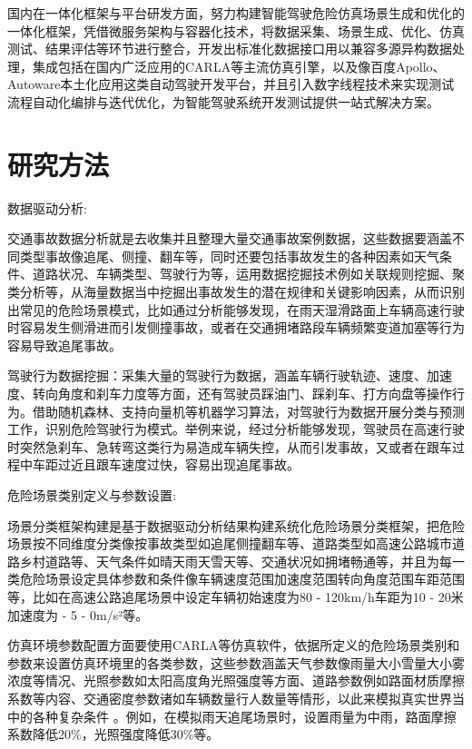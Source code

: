 国内在一体化框架与平台研发方面，努力构建智能驾驶危险仿真场景生成和优化的一体化框架，凭借微服务架构与容器化技术，将数据采集、场景生成、优化、仿真测试、结果评估等环节进行整合，开发出标准化数据接口用以兼容多源异构数据处理，集成包括在国内广泛应用的CARLA等主流仿真引擎，以及像百度Apollo、Autoware本土化应用这类自动驾驶开发平台，并且引入数字线程技术来实现测试流程自动化编排与迭代优化\cite{dingus2006100}，为智能驾驶系统开发测试提供一站式解决方案。

\section{研究方法}

数据驱动分析:

交通事故数据分析就是去收集并且整理大量交通事故案例数据，这些数据要涵盖不同类型事故像追尾、侧撞、翻车等，同时还要包括事故发生的各种因素如天气条件、道路状况、车辆类型、驾驶行为等，运用数据挖掘技术例如关联规则挖掘、聚类分析等，从海量数据当中挖掘出事故发生的潜在规律和关键影响因素，从而识别出常见的危险场景模式，比如通过分析能够发现，在雨天湿滑路面上车辆高速行驶时容易发生侧滑进而引发侧撞事故，或者在交通拥堵路段车辆频繁变道加塞等行为容易导致追尾事故\cite{uslu2014underground}。

驾驶行为数据挖掘：采集大量的驾驶行为数据，涵盖车辆行驶轨迹、速度、加速度、转向角度和刹车力度等方面，还有驾驶员踩油门、踩刹车、打方向盘等操作行为\cite{national2008integrated}。借助随机森林、支持向量机等机器学习算法，对驾驶行为数据开展分类与预测工作，识别危险驾驶行为模式。举例来说，经过分析能够发现，驾驶员在高速行驶时突然急刹车、急转弯这类行为易造成车辆失控，从而引发事故，又或者在跟车过程中车距过近且跟车速度过快，容易出现追尾事故\cite{sayer2009integrated}。

危险场景类别定义与参数设置:

场景分类框架构建是基于数据驱动分析结果构建系统化危险场景分类框架，把危险场景按不同维度分类像按事故类型如追尾侧撞翻车等、道路类型如高速公路城市道路乡村道路等、天气条件如晴天雨天雪天等、交通状况如拥堵畅通等，并且为每一类危险场景设定具体参数和条件像车辆速度范围加速度范围转向角度范围车距范围等，比如在高速公路追尾场景中设定车辆初始速度为80 - 120km/h车距为10 - 20米加速度为 - 5 - 0m/s²等\cite{sayer2011integrated}。

仿真环境参数配置方面要使用CARLA等仿真软件，依据所定义的危险场景类别和参数来设置仿真环境里的各类参数，这些参数涵盖天气参数像雨量大小雪量大小雾浓度等情况、光照参数如太阳高度角光照强度等方面、道路参数例如路面材质摩擦系数等内容、交通密度参数诸如车辆数量行人数量等情形，以此来模拟真实世界当中的各种复杂条件 。例如，在模拟雨天追尾场景时，设置雨量为中雨，路面摩擦系数降低20\%，光照强度降低30\%等。


